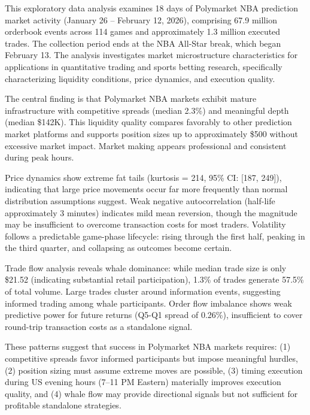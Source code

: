 \documentclass[11pt, a4paper]{report}
\begin{document}
This exploratory data analysis examines 18 days of Polymarket NBA prediction market activity (January 26 -- February 12, 2026), comprising 67.9 million orderbook events across 114 games and approximately 1.3 million executed trades. The collection period ends at the NBA All-Star break, which began February 13. The analysis investigates market microstructure characteristics for applications in quantitative trading and sports betting research, specifically characterizing liquidity conditions, price dynamics, and execution quality.

The central finding is that Polymarket NBA markets exhibit mature infrastructure with competitive spreads (median 2.3\%) and meaningful depth (median \$142K). This liquidity quality compares favorably to other prediction market platforms and supports position sizes up to approximately \$500 without excessive market impact. Market making appears professional and consistent during peak hours.

Price dynamics show extreme fat tails (kurtosis = 214, 95\% CI: [187, 249]), indicating that large price movements occur far more frequently than normal distribution assumptions suggest. Weak negative autocorrelation (half-life approximately 3 minutes) indicates mild mean reversion, though the magnitude may be insufficient to overcome transaction costs for most traders. Volatility follows a predictable game-phase lifecycle: rising through the first half, peaking in the third quarter, and collapsing as outcomes become certain.

Trade flow analysis reveals whale dominance: while median trade size is only \$21.52 (indicating substantial retail participation), 1.3\% of trades generate 57.5\% of total volume. Large trades cluster around information events, suggesting informed trading among whale participants. Order flow imbalance shows weak predictive power for future returns (Q5-Q1 spread of 0.26\%), insufficient to cover round-trip transaction costs as a standalone signal.

These patterns suggest that success in Polymarket NBA markets requires: (1) competitive spreads favor informed participants but impose meaningful hurdles, (2) position sizing must assume extreme moves are possible, (3) timing execution during US evening hours (7--11 PM Eastern) materially improves execution quality, and (4) whale flow may provide directional signals but not sufficient for profitable standalone strategies.

\newpage
\tableofcontents
\end{document}
